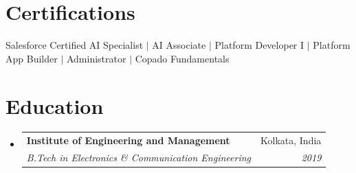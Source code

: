 \documentclass[letterpaper,11pt]{article}
\makeatletter
\newcommand{\resumeSubheading}[4]{
  \vspace{-2pt}\item
    \begin{tabular*}{0.97\textwidth}[t]{l@{\extracolsep{\fill}}r}
      \textbf{#1} & #2 \\
      \textit{\small#3} & \textit{\small #4} \\
    \end{tabular*}\vspace{-7pt}
}
\newcommand{\resumeSubHeadingListStart}{\begin{itemize}[leftmargin=0.15in, label={}]}
\newcommand{\resumeSubHeadingListEnd}{\end{itemize}}
\makeatother
\begin{document}
\section{Certifications}
 \begin{itemize}[leftmargin=0.15in, label={}]
    \small{\item{
     Salesforce Certified AI Specialist $|$ AI Associate $|$ Platform Developer I $|$ Platform App Builder $|$ Administrator $|$ Copado Fundamentals
    }}
 \end{itemize}

\section{Education}
  \resumeSubHeadingListStart
    \resumeSubheading
      {Institute of Engineering and Management}{Kolkata, India}
      {B.Tech in Electronics \& Communication Engineering}{2019}
  \resumeSubHeadingListEnd
\end{document}
